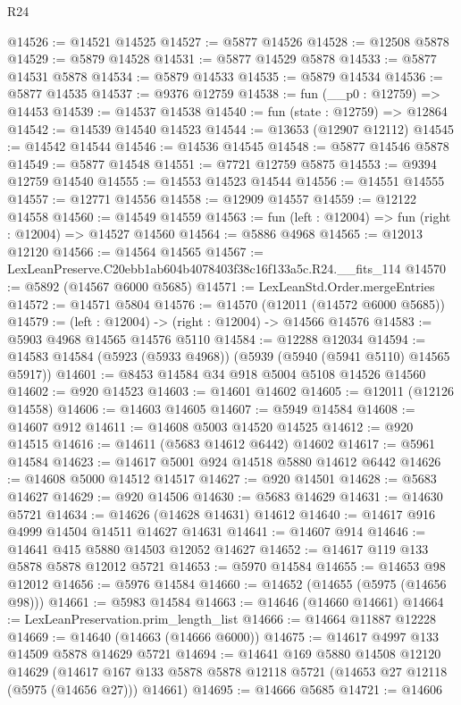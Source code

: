 \begin{lexlean}{R24}
\begin{coremodule}
@14526 := @14521 @14525
@14527 := @5877 @14526
@14528 := @12508 @5878
@14529 := @5879 @14528
@14531 := @5877 @14529 @5878
@14533 := @5877 @14531 @5878
@14534 := @5879 @14533
@14535 := @5879 @14534
@14536 := @5877 @14535
@14537 := @9376 @12759
@14538 := fun (__p0 : @12759) => @14453
@14539 := @14537 @14538
@14540 := fun (state : @12759) => @12864
@14542 := @14539 @14540 @14523
@14544 := @13653 (@12907 @12112)
@14545 := @14542 @14544
@14546 := @14536 @14545
@14548 := @5877 @14546 @5878
@14549 := @5877 @14548
@14551 := @7721 @12759 @5875
@14553 := @9394 @12759 @14540
@14555 := @14553 @14523 @14544
@14556 := @14551 @14555
@14557 := @12771 @14556
@14558 := @12909 @14557
@14559 := @12122 @14558
@14560 := @14549 @14559
@14563 := fun (left : @12004) => fun (right : @12004) => @14527 @14560
@14564 := @5886 @4968
@14565 := @12013 @12120
@14566 := @14564 @14565
@14567 := LexLeanPreserve.C20ebb1ab604b4078403f38c16f133a5c.R24.__fits_114
@14570 := @5892 (@14567 @6000 @5685)
@14571 := LexLeanStd.Order.mergeEntries
@14572 := @14571 @5804
@14576 := @14570 (@12011 (@14572 @6000 @5685))
@14579 := (left : @12004) -> (right : @12004) -> @14566 @14576
@14583 := @5903 @4968 @14565 @14576 @5110
@14584 := @12288 @12034
@14594 := @14583 @14584 (@5923 (@5933 @4968)) (@5939 (@5940 (@5941 @5110) @14565 @5917))
@14601 := @8453 @14584 @34 @918 @5004 @5108 @14526 @14560
@14602 := @920 @14523
@14603 := @14601 @14602
@14605 := @12011 (@12126 @14558)
@14606 := @14603 @14605
@14607 := @5949 @14584
@14608 := @14607 @912
@14611 := @14608 @5003 @14520 @14525
@14612 := @920 @14515
@14616 := @14611 (@5683 @14612 @6442) @14602
@14617 := @5961 @14584
@14623 := @14617 @5001 @924 @14518 @5880 @14612 @6442
@14626 := @14608 @5000 @14512 @14517
@14627 := @920 @14501
@14628 := @5683 @14627
@14629 := @920 @14506
@14630 := @5683 @14629
@14631 := @14630 @5721
@14634 := @14626 (@14628 @14631) @14612
@14640 := @14617 @916 @4999 @14504 @14511 @14627 @14631
@14641 := @14607 @914
@14646 := @14641 @415 @5880 @14503 @12052 @14627
@14652 := @14617 @119 @133 @5878 @5878 @12012 @5721
@14653 := @5970 @14584
@14655 := @14653 @98 @12012
@14656 := @5976 @14584
@14660 := @14652 (@14655 (@5975 (@14656 @98)))
@14661 := @5983 @14584
@14663 := @14646 (@14660 @14661)
@14664 := LexLeanPreservation.prim_length_list
@14666 := @14664 @11887 @12228
@14669 := @14640 (@14663 (@14666 @6000))
@14675 := @14617 @4997 @133 @14509 @5878 @14629 @5721
@14694 := @14641
    @169
    @5880
    @14508
    @12120
    @14629
    (@14617 @167 @133 @5878 @5878 @12118 @5721 (@14653 @27 @12118 (@5975 (@14656 @27))) @14661)
@14695 := @14666 @5685
@14721 := @14606

\end{coremodule}
\end{lexlean}

